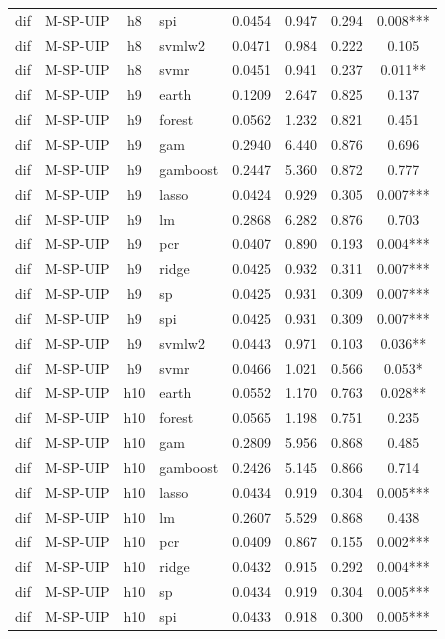 \begin{ThreePartTable}
\begin{longtable}[t]{llclcccc}
dif & M-SP-UIP & h8 & spi & 0.0454 & 0.947 & 0.294 & 0.008***\\
dif & M-SP-UIP & h8 & svmlw2 & 0.0471 & 0.984 & 0.222 & 0.105\\
dif & M-SP-UIP & h8 & svmr & 0.0451 & 0.941 & 0.237 & 0.011**\\
\addlinespace
dif & M-SP-UIP & h9 & earth & 0.1209 & 2.647 & 0.825 & 0.137\\
dif & M-SP-UIP & h9 & forest & 0.0562 & 1.232 & 0.821 & 0.451\\
dif & M-SP-UIP & h9 & gam & 0.2940 & 6.440 & 0.876 & 0.696\\
dif & M-SP-UIP & h9 & gamboost & 0.2447 & 5.360 & 0.872 & 0.777\\
dif & M-SP-UIP & h9 & lasso & 0.0424 & 0.929 & 0.305 & 0.007***\\
dif & M-SP-UIP & h9 & lm & 0.2868 & 6.282 & 0.876 & 0.703\\
dif & M-SP-UIP & h9 & pcr & 0.0407 & 0.890 & 0.193 & 0.004***\\
dif & M-SP-UIP & h9 & ridge & 0.0425 & 0.932 & 0.311 & 0.007***\\
dif & M-SP-UIP & h9 & sp & 0.0425 & 0.931 & 0.309 & 0.007***\\
dif & M-SP-UIP & h9 & spi & 0.0425 & 0.931 & 0.309 & 0.007***\\
dif & M-SP-UIP & h9 & svmlw2 & 0.0443 & 0.971 & 0.103 & 0.036**\\
dif & M-SP-UIP & h9 & svmr & 0.0466 & 1.021 & 0.566 & 0.053*\\
\addlinespace
dif & M-SP-UIP & h10 & earth & 0.0552 & 1.170 & 0.763 & 0.028**\\
dif & M-SP-UIP & h10 & forest & 0.0565 & 1.198 & 0.751 & 0.235\\
dif & M-SP-UIP & h10 & gam & 0.2809 & 5.956 & 0.868 & 0.485\\
dif & M-SP-UIP & h10 & gamboost & 0.2426 & 5.145 & 0.866 & 0.714\\
dif & M-SP-UIP & h10 & lasso & 0.0434 & 0.919 & 0.304 & 0.005***\\
dif & M-SP-UIP & h10 & lm & 0.2607 & 5.529 & 0.868 & 0.438\\
dif & M-SP-UIP & h10 & pcr & 0.0409 & 0.867 & 0.155 & 0.002***\\
dif & M-SP-UIP & h10 & ridge & 0.0432 & 0.915 & 0.292 & 0.004***\\
dif & M-SP-UIP & h10 & sp & 0.0434 & 0.919 & 0.304 & 0.005***\\
dif & M-SP-UIP & h10 & spi & 0.0433 & 0.918 & 0.300 & 0.005***\\

\end{longtable}
\end{ThreePartTable}
